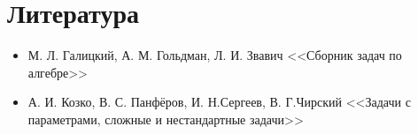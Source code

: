 \section {Литература}

\begin {itemize}
    \item {М. Л. Галицкий, А. М. Гольдман, Л. И. Звавич <<Сборник задач по алгебре>>}
    \item {А. И. Козко, В. С. Панфёров, И. Н.Сергеев, В. Г.Чирский <<Задачи с параметрами, сложные
           и нестандартные задачи>>}
\end {itemize}